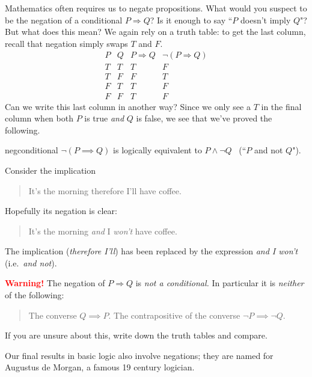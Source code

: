  

Mathematics often requires us to negate propositions. What would you suspect to be the negation of a conditional $P\Longrightarrow Q$? Is it enough to say ``$P$ doesn't imply $Q$"? But what does this mean? We again rely on a truth table: to get the last column, recall that negation simply swaps $T$ and $F$.
\[
	\begin{array}{cc|c|c}
		P & Q & P\Longrightarrow Q & \neg(P\Longrightarrow Q)\\\hline
		T & T & T & F\\
		T & F & F & T\\
		F & T & T & F\\
		F & F & T & F
	\end{array}
\]
Can we write this last column in another way? Since we only see a $T$ in the final column when both $P$ is true \emph{and} $Q$ is false, we see that we've proved the following.

\begin{thm}{}{negconditional}
	$\neg(P\implies Q)$ is logically equivalent to $P\wedge\neg Q$ \ (``$P$ and not $Q$").
\end{thm}


\begin{example}{}{}
	Consider the implication
	\begin{quote}
	  It's the morning therefore I'll have coffee.
	\end{quote}
	Hopefully its negation is clear:
	\begin{quote}
	  It's the morning \emph{and} I \emph{won't} have coffee.
	\end{quote}
	The implication (\emph{therefore I'll}) has been replaced by the expression \emph{and I won't} (i.e.\ \emph{and not}).
\end{example}



{\bf \textcolor{red}{Warning!}} The negation of $P\Longrightarrow Q$ is \emph{not a conditional.} In particular it is \emph{neither} of the following:
\begin{quote}
  The converse $Q\implies P$.\smallbreak
  The contrapositive of the converse $\neg P\implies\neg Q$. 
\end{quote}
If you are unsure about this, write down the truth tables and compare.

\bigbreak


Our final results in basic logic also involve negations; they are named for Augustus de Morgan, a famous 19\th{} century logician.

